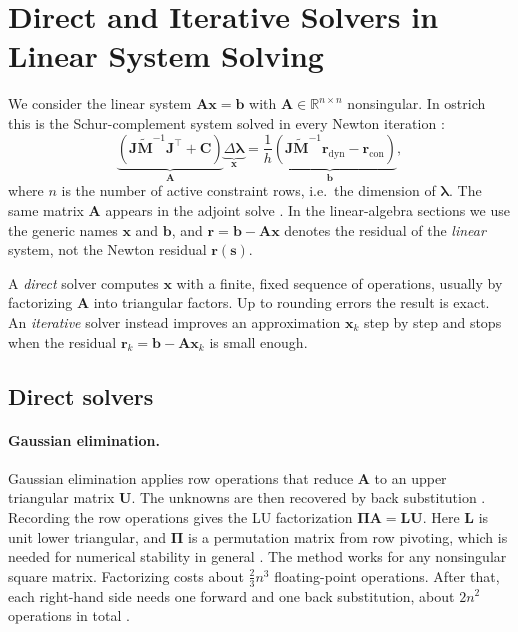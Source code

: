 \section{Direct and Iterative Solvers in Linear System Solving}
\label{sec:solvers}

We consider the linear system $\mathbf{A}\mathbf{x} = \mathbf{b}$ with
$\mathbf{A} \in \mathbb{R}^{n \times n}$ nonsingular. In ostrich this is the
Schur-complement system solved in every Newton iteration
\citep[eq.~(12)]{kucera2026ostrich}:
\begin{equation}
  \underbrace{\left(\mathbf{J}\tilde{\mathbf{M}}^{-1}\mathbf{J}^\top + \mathbf{C}\right)}_{\mathbf{A}}
  \underbrace{\Delta\boldsymbol{\lambda}}_{\mathbf{x}}
  = \underbrace{\frac{1}{h}\left(\mathbf{J}\tilde{\mathbf{M}}^{-1}\mathbf{r}_{\text{dyn}} - \mathbf{r}_{\text{con}}\right)}_{\mathbf{b}} ,
  \label{eq:ostrich-system}
\end{equation}
where $n$ is the number of active constraint rows, i.e.\ the dimension of
$\boldsymbol{\lambda}$. The same matrix $\mathbf{A}$ appears in the adjoint
solve \citep[eq.~(18)]{kucera2026ostrich}. In the linear-algebra sections we
use the generic names $\mathbf{x}$ and $\mathbf{b}$, and $\mathbf{r} =
\mathbf{b} - \mathbf{A}\mathbf{x}$ denotes the residual of the \emph{linear}
system, not the Newton residual $\mathbf{r}(\mathbf{s})$.

A \emph{direct} solver computes $\mathbf{x}$ with a finite, fixed
sequence of operations, usually by factorizing $\mathbf{A}$ into triangular factors.
Up to rounding errors the result is exact. An \emph{iterative} solver instead
improves an approximation $\mathbf{x}_k$ step by step and stops when the residual
$\mathbf{r}_k = \mathbf{b} - \mathbf{A}\mathbf{x}_k$ is small enough.

\subsection{Direct solvers}
\label{sec:direct-solvers}

\paragraph{Gaussian elimination.}
Gaussian elimination applies row operations that reduce $\mathbf{A}$ to an upper
triangular matrix $\mathbf{U}$. The unknowns are then recovered by back substitution
\citep{wiki:gaussian-elimination}. Recording the row operations gives the LU
factorization $\boldsymbol{\Pi}\mathbf{A} = \mathbf{L}\mathbf{U}$. Here
$\mathbf{L}$ is unit lower triangular, and $\boldsymbol{\Pi}$ is a
permutation matrix from row pivoting, which is needed for numerical
stability in general \citep{golub2013matrix,trefethen1997numerical}. The
method works for any nonsingular square matrix. Factorizing costs about
$\tfrac{2}{3}n^3$ floating-point operations. After that, each right-hand side
needs one forward and one back substitution, about $2n^2$ operations in total
\citep{wiki:gaussian-elimination,golub2013matrix}.


